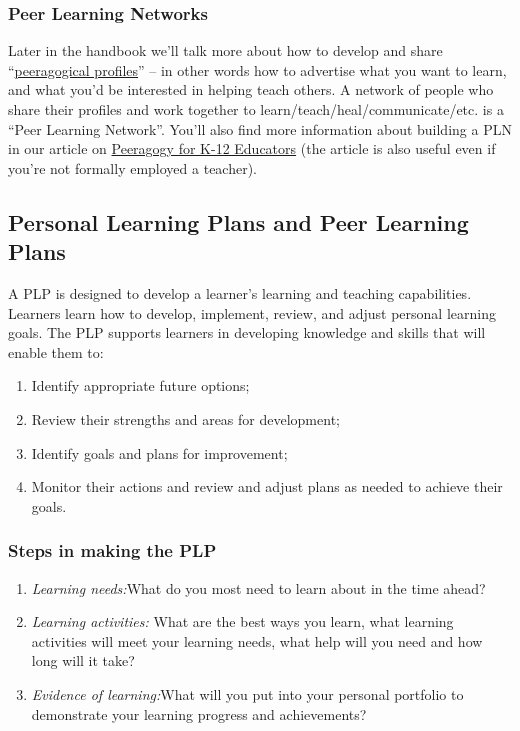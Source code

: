 \subsubsection{Peer Learning Networks}

Later in the handbook we'll talk more about how to develop and share
``\href{http://peeragogy.org/patterns-usecases/patterns-and-heuristics/roadmap/}{peeragogical
profiles}'' -- in other words how to advertise what you want to learn,
and what you'd be interested in helping teach others. A network of
people who share their profiles and work together to
learn/teach/heal/communicate/etc. is a ``Peer Learning Network''. You'll
also find more information about building a PLN in our article on
\href{http://peeragogy.org/k-12-peeragogy/}{Peeragogy for K-12
Educators} (the article is also useful even if you're not formally
employed a teacher).

\subsection{Personal Learning Plans and Peer Learning Plans}

A PLP is designed to develop a learner's learning and teaching
capabilities. Learners learn how to develop, implement, review, and
adjust personal learning goals. The PLP supports learners in developing
knowledge and skills that will enable them to:

\begin{enumerate}
\item
  Identify appropriate future options;
\item
  Review their strengths and areas for development;
\item
  Identify goals and plans for improvement;
\item
  Monitor their actions and review and adjust plans as needed to achieve
  their goals.
\end{enumerate}

\subsubsection{\textbf{Steps in making the PLP}}

\begin{enumerate}
\item
  \emph{Learning needs:}What do you most need to learn about in the time
  ahead?
\item
  \emph{Learning activities:} What are the best ways you learn, what
  learning activities will meet your learning needs, what help will you
  need and how long will it take?
\item
  \emph{Evidence of learning:}What will you put into your personal
  portfolio to demonstrate your learning progress and achievements?
\end{enumerate}

